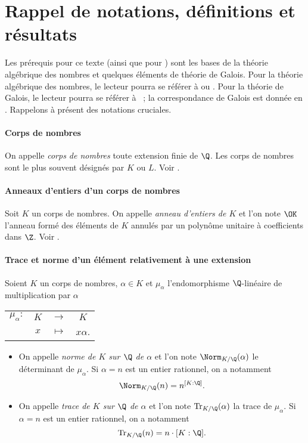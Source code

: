 \section*{Rappel de notations, définitions et résultats}

Les prérequis pour ce texte (ainsi que pour \cite{article}) sont les bases de la théorie algébrique des nombres et quelques éléments de théorie de Galois. Pour la théorie algébrique des nombres, le lecteur pourra se référer à \cite[ch. II, III, V et VI]{Samuel} ou \cite[ch. II, III et IV]{Kraus}. Pour la théorie de Galois, le lecteur pourra se référer à \cite[ch. XXIII à XVII]{GrandCombat} ~; la correspondance de Galois est donnée en \cite[ch. XXVII § 1 p. 919 th. 1.5]{GrandCombat}. Rappelons à présent des notations cruciales.

\paragraph{Corps de nombres} On appelle \emph{corps de nombres} toute extension finie de $\Q$. Les corps de nombres sont le plus souvent désignés par $K$ ou $L$. Voir \cite[ch. II § 8]{Samuel}.

\paragraph{Anneaux d'entiers d'un corps de nombres} Soit $K$ un corps de nombres. On appelle \emph{anneau d'entiers de $K$} et l'on note $\OK$ l'anneau formé des éléments de $K$ annulés par un polynôme unitaire à coefficients dans $\Z$. Voir \cite[ch. II]{Samuel}.

\paragraph{Trace et norme d'un élément relativement à une extension} Soient $K$ un corps de nombres, $\alpha\in K$ et $\mu_\alpha$ l'endomorphisme $\Q$-linéaire de multiplication par $\alpha$ 
\begin{center}
	\begin{tabular}{rccc}
		$\mu_\alpha : $ & $K$ & $\longrightarrow$ & $K$ \\
		& $x$	& $\longmapsto$ & $x\alpha$.
	\end{tabular}
\end{center}

\begin{itemize}
	\item On appelle \emph{norme de $K$ sur $\Q$ de $\alpha$} et l'on note $\Norm_{K/\Q}(\alpha)$ le déterminant de $\mu_\alpha$. Si $\alpha=n$ est un entier rationnel, on a notamment \[\Norm_{K/\Q}(n) = n^{[K : \Q]}.\]
	\item On appelle \emph{trace de $K$ sur $\Q$ de $\alpha$} et l'on note $\mathrm{Tr}_{K/\Q}(\alpha)$ la trace de $\mu_\alpha$. Si $\alpha= n$ est un entier rationnel, on a notamment \[\mathrm{Tr}_{K/\Q}(n) = n\cdot{[K : \Q]}.\]
\end{itemize}

